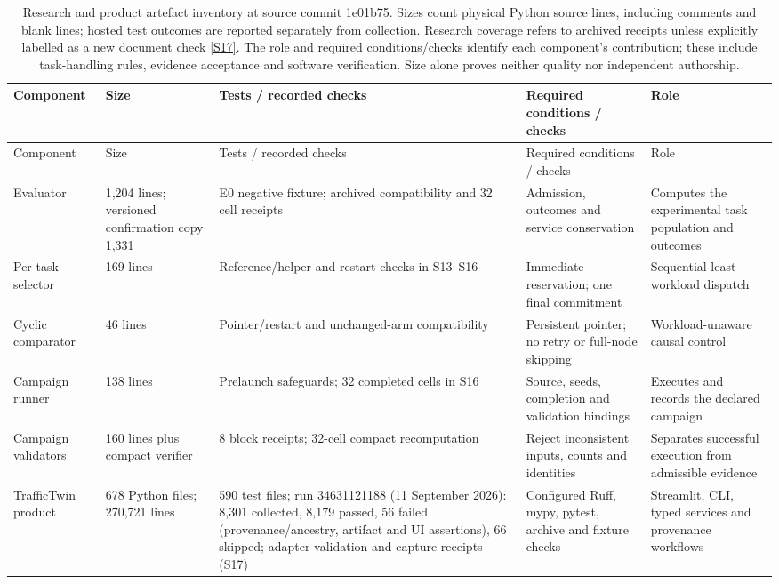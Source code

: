 \documentclass[12pt,a4paper]{article}
\begin{document}
\begingroup
\singlespacing\footnotesize\setlength{\tabcolsep}{3pt}
\begin{xltabular}{\textwidth}{@{}YYYYY@{}}
\caption[Software components and checks]{Research and product artefact inventory at source commit 1e01b75. Sizes count physical Python source lines, including comments and blank lines; hosted test outcomes are reported separately from collection. Research coverage refers to archived receipts unless explicitly labelled as a new document check \hyperref[source-s17]{[S17]}. The role and required conditions/checks identify each component's contribution; these include task-handling rules, evidence acceptance and software verification. Size alone proves neither quality nor independent authorship.}\label{tab:A1} \\
\toprule
Component & Size & Tests / recorded checks & Required conditions / checks & Role \\
\midrule\endfirsthead
\toprule
Component & Size & Tests / recorded checks & Required conditions / checks & Role \\
\midrule\endhead
\bottomrule\endfoot
Evaluator & 1,204 lines; versioned confirmation copy 1,331 & E0 negative fixture; archived compatibility and 32 cell receipts & Admission, outcomes and service conservation & Computes the experimental task population and outcomes \\
Per-task selector & 169 lines & Reference/helper and restart checks in S13--S16 & Immediate reservation; one final commitment & Sequential least-workload dispatch \\
Cyclic comparator & 46 lines & Pointer/restart and unchanged-arm compatibility & Persistent pointer; no retry or full-node skipping & Workload-unaware causal control \\
Campaign runner & 138 lines & Prelaunch safeguards; 32 completed cells in S16 & Source, seeds, completion and validation bindings & Executes and records the declared campaign \\
Campaign validators & 160 lines plus compact verifier & 8 block receipts; 32-cell compact recomputation & Reject inconsistent inputs, counts and identities & Separates successful execution from admissible evidence \\
TrafficTwin product & 678 Python files; 270,721 lines & 590 test files; run 34631121188 (11 September 2026): 8,301 collected, 8,179 passed, 56 failed (provenance/ancestry, artifact and UI assertions), 66 skipped; adapter validation and capture receipts (S17) & Configured Ruff, mypy, pytest, archive and fixture checks & Streamlit, CLI, typed services and provenance workflows \\
\end{xltabular}
\endgroup
\end{document}
